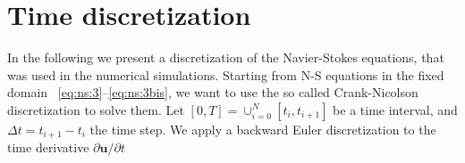 \documentclass[a4paper,11pt,openright,twoside]{book}
\begin{document}
%




\section{Time discretization}

In the following we present a discretization of the Navier-Stokes equations, that was used in the numerical simulations. Starting from N-S equations in the fixed domain ~\eqref{eq:ns:3}--\eqref{eq:ns:3bis}, we want to use the so called Crank-Nicolson discretization to solve them. Let $[0, T] = \cup^N_{i=0} [t_i, t_{i+1}] $ be a time interval, and $\Delta t = t_{i+1} - t_i$ the time step. We apply a backward Euler discretization to the time derivative $\partial \mathbf{u}/ \partial t$
\end{document}
